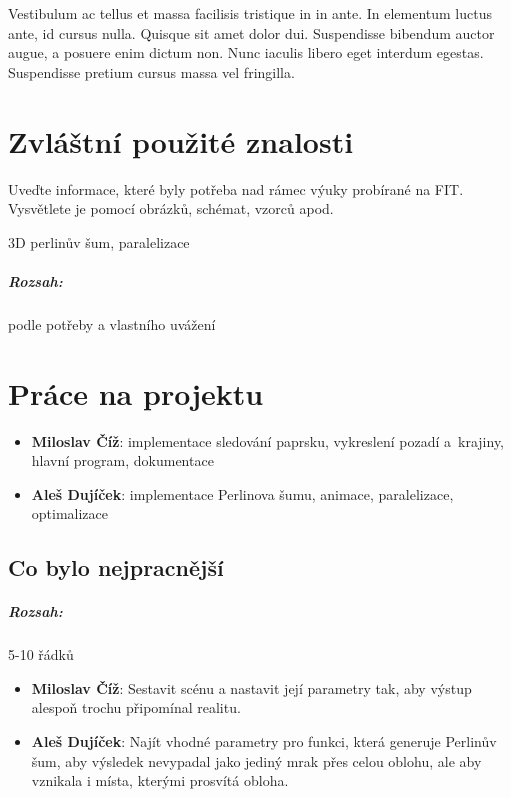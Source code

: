 \documentclass[12pt,a4paper,titlepage,final]{report}
\newcommand\AuthorA{Miloslav Číž}
\newcommand\AuthorB{Aleš Dujíček}
\begin{document}
Vestibulum ac tellus et massa facilisis tristique in in ante. In elementum luctus ante, id cursus nulla. Quisque sit amet dolor dui. Suspendisse bibendum auctor augue, a posuere enim dictum non. Nunc iaculis libero eget interdum egestas. Suspendisse pretium cursus massa vel fringilla.



\chapter{Zvláštní použité znalosti}

Uveďte informace, které byly potřeba nad rámec výuky probírané na FIT.
Vysvětlete je pomocí obrázků, schémat, vzorců apod.

3D perlinův šum, paralelizace

\paragraph{Rozsah:} podle potřeby a vlastního uvážení


\chapter{Práce na projektu}

\begin{itemize}
\item \textbf{\AuthorA}: implementace sledování paprsku, vykreslení pozadí a~krajiny, hlavní program, dokumentace
\item \textbf{\AuthorB}: implementace Perlinova šumu, animace, paralelizace, optimalizace
\end{itemize}

\section{Co bylo nejpracnější}

\paragraph{Rozsah:} 5-10 řádků

\begin{itemize}
\item \textbf{\AuthorA}: Sestavit scénu a nastavit její parametry tak,
aby výstup alespoň trochu připomínal realitu.
\item \textbf{\AuthorB}: Najít vhodné parametry pro funkci, která generuje
Perlinův šum, aby výsledek nevypadal jako jediný mrak přes celou oblohu,
ale aby vznikala i místa, kterými prosvítá obloha.
\end{itemize}
\end{document}
